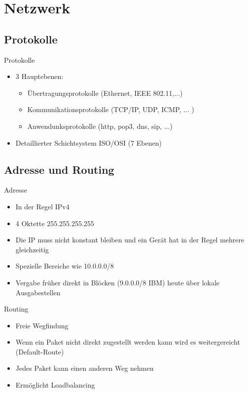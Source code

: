 \documentclass[aspectratio=43]{beamer}
\begin{document}
\section{Netzwerk}
\begin{frame} 
\subsection{Protokolle}
	\begin{block}{Protokolle}
	\begin{itemize}
	\item 3 Hauptebenen:
	\begin{itemize}
	\item Übertragungsprotokolle (Ethernet, IEEE 802.11,...)
	\item Kommunikationsprotokolle (TCP/IP, UDP, ICMP, ... )
	\item Anwendunksprotokolle (http, pop3, dns, sip, ...)
	\end{itemize}
	\item Detaillierter Schichtsystem ISO/OSI (7 Ebenen)
	\end{itemize}
	\end{block}
	
\end{frame}
\subsection{Adresse und Routing}
\begin{frame} 

	\begin{block}{Adresse}
	\begin{itemize}
	\item In der Regel IPv4
	\item 4 Oktette 255.255.255.255
	\item Die IP muss nicht konstant bleiben und ein Gerät hat in der Regel mehrere gleichzeitig 
	\item Spezielle Bereiche wie 10.0.0.0/8
	\item Vergabe früher direkt in Blöcken (9.0.0.0/8 IBM) heute über lokale Ausgabestellen
	\end{itemize}
	\end{block}
	
\end{frame}

\begin{frame} 

	\begin{block}{Routing}
	\begin{itemize}
	\item Freie Wegfindung
	\item Wenn ein Paket nicht direkt zugestellt werden kann wird es weitergereicht (Default-Route)
	\item Jedes Paket kann einen anderen Weg nehmen
	\item Ermöglicht Loadbalancing
	\end{itemize}
	\end{block}
	
\end{frame}
\end{document}

